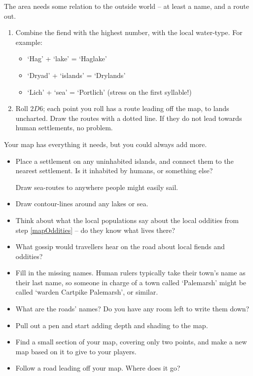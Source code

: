 \begin{multicols}{2}

The area needs some relation to the outside world -- at least a name, and a route out.

\begin{enumerate}
  \item
  Combine the fiend with the highest number, with the local water-type.
  For example:
  \begin{itemize}
  \item
    `Hag' + `lake' = `Haglake'
  \item
    `Dryad' + `islands' = `Drylands'
  \item
    `Lich' + `sea' = `Portlich' (stress on the first syllable!)
  \end{itemize}

  \item
  Roll $2D6$; each point you roll has a route leading off the map, to lands uncharted.
  Draw the routes with a dotted line.
  If they do not lead towards human settlements, no problem.
\end{enumerate}


Your map has everything it needs, but you could always add more.

\begin{itemize}
  \item
  Place a settlement on any uninhabited islands, and connect them to the nearest settlement.
  Is it inhabited by humans, or something else?

  Draw sea-routes to anywhere people might easily sail.
  \item
  Draw contour-lines around any lakes or sea.
  \item
  Think about what the local populations say about the local oddities from step \ref{mapOddities} -- do they know what lives there?
  \item
  What gossip would travellers hear on the road about local fiends and oddities?
  \item
  Fill in the missing names.
  Human rulers typically take their town's name as their last name, so someone in charge of a town called `Palemarsh' might be called  `\Gls{warden} Cartpike Palemarsh', or similar.
  \item
  What are the roads' names?
  Do you have any room left to write them down?
  \item
  Pull out a pen and start adding depth and shading to the map.
  \item
  Find a small section of your map, covering only two points, and make a new map based on it to give to your players.
  \item
  Follow a road leading off your map.
  Where does it go?


\end{itemize}
\end{multicols}

